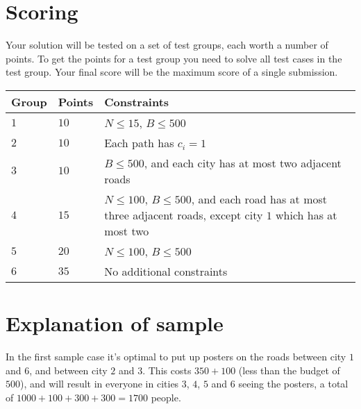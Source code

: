 \section*{Scoring}
Your solution will be tested on a set of test groups, each worth a number of points.
To get the points for a test group you need to solve all test cases in the test group. Your final score will be the maximum score of a single submission.

\noindent
\begin{tabular}{| l | l | p{10cm} |}
\hline
Group & Points & Constraints \\ \hline
$1$   & $10$         & $N \le 15$, $B \le 500$ \\ \hline
$2$   & $10$         & Each path has $c_i = 1$ \\ \hline
$3$   & $10$         & $B \le 500$, and each city has at most two adjacent roads \\ \hline
$4$   & $15$         & $N \le 100$, $B \le 500$, and each road has at most three adjacent roads, except city $1$ which has at most two \\ \hline
$5$   & $20$         & $N \le 100$, $B \le 500$ \\ \hline
$6$   & $35$         & No additional constraints \\ \hline
\end{tabular}

\section*{Explanation of sample}
In the first sample case it's optimal to put up posters on the roads between city $1$ and $6$, and between city $2$ and $3$.
This costs $350 + 100$ (less than the budget of $500$), and will result in everyone in cities $3$, $4$, $5$ and $6$ seeing the posters, a total of $1000 + 100 + 300 + 300 = 1700$ people.
